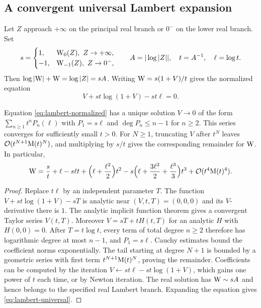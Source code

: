 \subsection{A convergent universal Lambert expansion}
\label{sec:lambert-expansion}

Let $Z$ approach $+\infty$ on the principal real branch or $0^-$ on the lower real branch. Set
\[
 s=\begin{cases}1,&\W_0(Z),\ Z\to+\infty,\\-1,&\W_{-1}(Z),\ Z\to0^-,\end{cases}
 \qquad A=|\log|Z||,\quad t=A^{-1},\quad\ell=\log t.
\]
Then $\log|\mathrm W|+\mathrm W=\log|Z|=sA$. Writing $\mathrm W=s(1+V)/t$ gives the normalized equation
\begin{equation}
 V+s t\log(1+V)-s t\ell=0.
 \label{eq:lambert-normalized}
\end{equation}

\begin{theorem}
\label{thm:lambert}
Equation \eqref{eq:lambert-normalized} has a unique solution $V\to0$ of the form $\sum_{n\ge1}t^nP_n(\ell)$ with $P_1=s\ell$ and $\deg P_n\le n-1$ for $n\ge2$. This series converges for sufficiently small $t>0$. For $N\ge1$, truncating $V$ after $t^N$ leaves $\mathcal O(t^{N+1}\mathrm M(t)^N)$, and multiplying by $s/t$ gives the corresponding remainder for $\mathrm W$. In particular,
\begin{equation}
 \mathrm W=\frac{s}{t}+\ell-s\ell t+
 \Bigl(\ell+\frac{\ell^2}{2}\Bigr)t^2
 -s\Bigl(\ell+\frac{3\ell^2}{2}+\frac{\ell^3}{3}\Bigr)t^3
 +\mathcal O(t^4\mathrm M(t)^4).
 \label{eq:lambert-universal}
\end{equation}
\end{theorem}
\begin{proof}
Replace $t\ell$ by an independent parameter $T$. The function $V+s t\log(1+V)-sT$ is analytic near $(V,t,T)=(0,0,0)$ and its $V$-derivative there is $1$. The analytic implicit function theorem gives a convergent Taylor series $V(t,T)$. Moreover $V=sT+t H(t,T)$ for an analytic $H$ with $H(0,0)=0$. After $T=t\log t$, every term of total degree $n\ge2$ therefore has logarithmic degree at most $n-1$, and $P_1=s\ell$. Cauchy estimates bound the coefficient norms exponentially. The tail starting at degree $N+1$ is bounded by a geometric series with first term $t^{N+1}\mathrm M(t)^N$, proving the remainder. Coefficients can be computed by the iteration $V\gets s t\ell-s t\log(1+V)$, which gains one power of $t$ each time, or by Newton iteration. The real solution has $\mathrm W\sim sA$ and hence belongs to the specified real Lambert branch. Expanding the equation gives \eqref{eq:lambert-universal}.
\end{proof}


